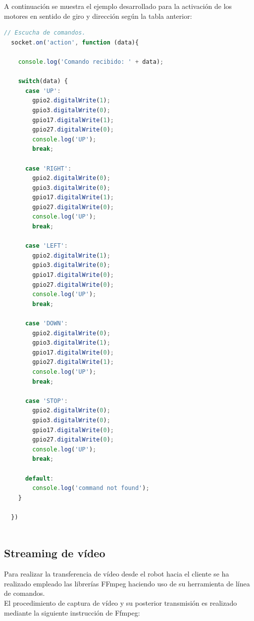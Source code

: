 A continuación se muestra el ejemplo desarrollado para la activación de los motores en sentido de giro y dirección según la tabla anterior:\\

\begin{lstlisting}[language=JavaScript]
  // Escucha de comandos.  
  socket.on('action', function (data){

    console.log('Comando recibido: ' + data);

    switch(data) {
      case 'UP':
        gpio2.digitalWrite(1);
        gpio3.digitalWrite(0);
        gpio17.digitalWrite(1);
        gpio27.digitalWrite(0);
        console.log('UP');
        break;

      case 'RIGHT':
        gpio2.digitalWrite(0);
        gpio3.digitalWrite(0);
        gpio17.digitalWrite(1);
        gpio27.digitalWrite(0);
        console.log('UP');
        break;

      case 'LEFT':
        gpio2.digitalWrite(1);
        gpio3.digitalWrite(0);
        gpio17.digitalWrite(0);
        gpio27.digitalWrite(0);
        console.log('UP');
        break;

      case 'DOWN':
        gpio2.digitalWrite(0);
        gpio3.digitalWrite(1);
        gpio17.digitalWrite(0);
        gpio27.digitalWrite(1);
        console.log('UP');
        break;

      case 'STOP':
        gpio2.digitalWrite(0);
        gpio3.digitalWrite(0);
        gpio17.digitalWrite(0);
        gpio27.digitalWrite(0);
        console.log('UP');
        break;

      default:
        console.log('command not found');
    }

  })
    
\end{lstlisting}



\subsection{ Streaming de vídeo }

Para realizar la transferencia de vídeo desde el robot hacia el cliente se ha realizado empleado las librerías FFmpeg haciendo uso de su herramienta de línea de comandos.\\

El procedimiento de captura de vídeo y su posterior transmisión es realizado mediante la siguiente instrucción de Ffmpeg:\\

